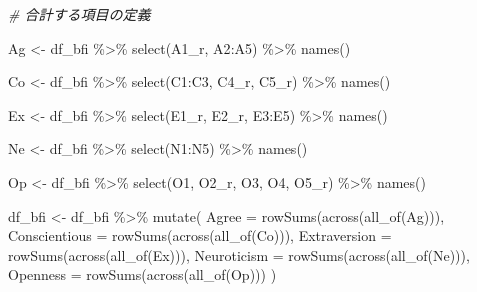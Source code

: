 \documentclass[
  xelatex,ja=standard, b5paper]{bxjsbook}
\newenvironment{Shaded}{\begin{snugshade}}{\end{snugshade}}
\newcommand{\AttributeTok}[1]{\textcolor[rgb]{0.77,0.63,0.00}{#1}}
\newcommand{\CommentTok}[1]{\textcolor[rgb]{0.56,0.35,0.01}{\textit{#1}}}
\newcommand{\FunctionTok}[1]{\textcolor[rgb]{0.00,0.00,0.00}{#1}}
\newcommand{\NormalTok}[1]{#1}
\newcommand{\OtherTok}[1]{\textcolor[rgb]{0.56,0.35,0.01}{#1}}
\newcommand{\SpecialCharTok}[1]{\textcolor[rgb]{0.00,0.00,0.00}{#1}}
\begin{document}
\begin{Shaded}
\begin{Highlighting}[]
\CommentTok{\# 合計する項目の定義}

\NormalTok{Ag }\OtherTok{\textless{}{-}} 
\NormalTok{df\_bfi }\SpecialCharTok{\%\textgreater{}\%} 
  \FunctionTok{select}\NormalTok{(A1\_r, A2}\SpecialCharTok{:}\NormalTok{A5) }\SpecialCharTok{\%\textgreater{}\%} 
  \FunctionTok{names}\NormalTok{()}

\NormalTok{Co }\OtherTok{\textless{}{-}} 
\NormalTok{df\_bfi }\SpecialCharTok{\%\textgreater{}\%} 
  \FunctionTok{select}\NormalTok{(C1}\SpecialCharTok{:}\NormalTok{C3, C4\_r, C5\_r) }\SpecialCharTok{\%\textgreater{}\%} 
  \FunctionTok{names}\NormalTok{()}

\NormalTok{Ex }\OtherTok{\textless{}{-}} 
\NormalTok{  df\_bfi }\SpecialCharTok{\%\textgreater{}\%} 
  \FunctionTok{select}\NormalTok{(E1\_r, E2\_r, E3}\SpecialCharTok{:}\NormalTok{E5) }\SpecialCharTok{\%\textgreater{}\%} 
  \FunctionTok{names}\NormalTok{()}

\NormalTok{Ne }\OtherTok{\textless{}{-}} 
\NormalTok{df\_bfi }\SpecialCharTok{\%\textgreater{}\%} 
  \FunctionTok{select}\NormalTok{(N1}\SpecialCharTok{:}\NormalTok{N5) }\SpecialCharTok{\%\textgreater{}\%} 
  \FunctionTok{names}\NormalTok{()}

\NormalTok{Op }\OtherTok{\textless{}{-}} 
\NormalTok{df\_bfi }\SpecialCharTok{\%\textgreater{}\%} 
  \FunctionTok{select}\NormalTok{(O1, O2\_r, O3, O4, O5\_r) }\SpecialCharTok{\%\textgreater{}\%} 
  \FunctionTok{names}\NormalTok{()}


\NormalTok{df\_bfi }\OtherTok{\textless{}{-}} 
\NormalTok{  df\_bfi }\SpecialCharTok{\%\textgreater{}\%} 
  \FunctionTok{mutate}\NormalTok{(}
    \AttributeTok{Agree =} \FunctionTok{rowSums}\NormalTok{(}\FunctionTok{across}\NormalTok{(}\FunctionTok{all\_of}\NormalTok{(Ag))),}
    \AttributeTok{Conscientious =} \FunctionTok{rowSums}\NormalTok{(}\FunctionTok{across}\NormalTok{(}\FunctionTok{all\_of}\NormalTok{(Co))),}
    \AttributeTok{Extraversion =} \FunctionTok{rowSums}\NormalTok{(}\FunctionTok{across}\NormalTok{(}\FunctionTok{all\_of}\NormalTok{(Ex))),}
    \AttributeTok{Neuroticism =} \FunctionTok{rowSums}\NormalTok{(}\FunctionTok{across}\NormalTok{(}\FunctionTok{all\_of}\NormalTok{(Ne))),}
    \AttributeTok{Openness =} \FunctionTok{rowSums}\NormalTok{(}\FunctionTok{across}\NormalTok{(}\FunctionTok{all\_of}\NormalTok{(Op)))}
\NormalTok{    )}
\end{Highlighting}
\end{Shaded}
\end{document}
